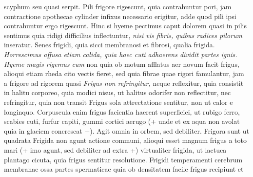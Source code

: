 scyphum seu quasi serpit. Pili frigore rigescunt, quia contrahuntur pori\protect{}, jam contractione apothecae\protect{} cylinder infixus necessario erigitur, adde quod pili ipsi contrahuntur ergo rigescunt. Hinc si hyeme pectimus caput\protect{} dolorem quasi in pilis sentimus quia ridigi difficilius inflectuntur, \textit{nisi vis fibris, quibus radices pilorum\protect{} } inseratur. Senes frigidi, quia sicci membranosi et fibrosi, qualia frigida. \textit{Horrescimus affusa etiam calida, quia haec cuti adhaerens dividit partes ignis. Hyeme magis rigemus cum } non quia ob motum afflatus aer novum facit frigus, alioqui etiam rheda cito vectis fieret, sed quia fibrae quae rigori famulantur, jam a frigore ad rigorem\protect{}  quasi  \textit{Frigus non refringitur,} neque reflexitur, quia consistit in halitu corporeo\protect{}, quia modici nisus\protect{}, ut halitus odorifer\protect{} non reflectitur, nec refringitur, quia non transit  Frigus sola attrectatione sentitur, non ut calor e longinquo. Corpuscula enim frigus facientia haerent superficiei, ut rubigo ferro\protect{}, scabies cuti\protect{}, furfur capiti\protect{}, gummi cortici\protect{} aerugo  (+ unde et ex aqua non avolat quia in glaciem concrescat +). Agit omnia in orbem, sed debiliter. Frigora sunt ut quadrata  Frigida non agunt actione communi, alioqui esset magnum frigus a toto mari  (+ imo agunt, sed debiliter ad extra +) virtualiter frigida, ut lactuca plantago cicuta\protect{}, quia frigus sentitur resolutione. Frigidi temperamenti cerebrum membranae ossa\protect{} partes spermaticae quia ob densitatem facile frigus recipiunt et 

